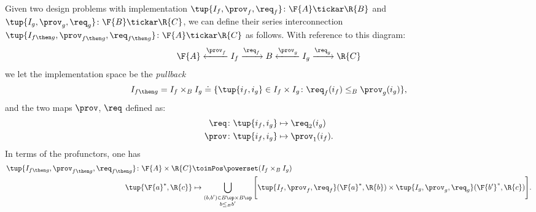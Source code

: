 \begin{definition}
\label{def:seriesdpi}
Given two design problems with implementation $\tup{I_f,\prov_f,\req_f}\colon \F{A}\tickar \R{B}$
and $\tup{I_g,\prov_g,\req_g}\colon \F{B}\tickar \R{C}$, we can define their
series interconnection $\tup{I_{f\then g},\prov_{f\then g},\req_{f\then g}}\colon \F{A}\tickar \R{C}$ as follows.
With reference to this diagram:
\begin{equation}
    \F{A} \xleftarrow{\prov_f} I_f \xrightarrow{\req_f} B
      \xleftarrow{\prov_g} I_g \xrightarrow{\req_g} \R{C}
\end{equation}
we let the implementation space be the \emph{pullback}
\begin{equation}
\begin{aligned}
I_{f\then g}&= I_f \times_B I_g \doteq \{
        \tup{i_f,i_g} \in I_f \times I_g \colon
        \req_f(i_f) \leq_{B} \prov_g(i_g)
    \},\\
\end{aligned}
\end{equation}
and the two maps $\prov$, $\req$ defined as:
\begin{equation}
\begin{aligned}
        \req  &\colon \tup{i_f,i_g} \mapsto \req_2(i_g)\\
        \prov  &\colon  \tup{i_f,i_g} \mapsto \prov_1(i_f).
\end{aligned}
\end{equation}
In terms of the profunctors, one has
\begin{equation}
\label{eq:seriesdpi}
\begin{aligned}
\tup{I_{f\then g},\prov_{f\then g},\req_{f\then g}}\colon \F{A}\times \R{C} &\toinPos \powerset(I_f \times_B I_g) \\
\tup{\F{a}^*,\R{c}} &\mapsto \bigcup_{\substack{(b,b') \in B\op \times B\op \\ b \leq_B b'}} \Bigg[ \tup{I_f,\prov_f,\req_f}(\F{a}^*,\R{b}) \times \tup{I_g,\prov_g,\req_g}(\F{b'}^*,\R{c}) \Bigg].
\end{aligned}
\end{equation}
\end{definition}

